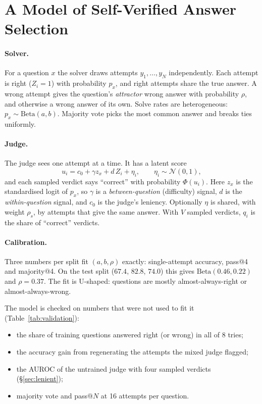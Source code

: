 \section{A Model of Self-Verified Answer Selection}
\label{sec:model}

\paragraph{Solver.}
For a question $x$ the solver draws attempts $y_1,\dots,y_N$ independently. Each attempt is right ($Z_i=1$) with
probability $p_x$, and right attempts share the true answer. A wrong attempt gives the question's \emph{attractor}
wrong answer with probability $\rho$, and otherwise a wrong answer of its own. Solve rates are heterogeneous:
$p_x\sim\mathrm{Beta}(a,b)$. Majority vote picks the most common answer and breaks ties uniformly.

\paragraph{Judge.}
The judge sees one attempt at a time. It has a latent score
\begin{equation}
u_i = c_0 + \gamma z_x + d\,Z_i + \eta_i,\qquad \eta_i\sim\mathcal N(0,1),
\label{eq:judge}
\end{equation}
and each sampled verdict says ``correct'' with probability $\Phi(u_i)$. Here $z_x$ is the standardised logit of
$p_x$, so $\gamma$ is a \emph{between-question} (difficulty) signal, $d$ is the \emph{within-question} signal, and
$c_0$ is the judge's leniency. Optionally $\eta$ is shared, with weight $\rho_s$, by attempts that give the same
answer. With $V$ sampled verdicts, $q_i$ is the share of ``correct'' verdicts.

\paragraph{Calibration.}
Three numbers per split fit $(a,b,\rho)$ exactly: single-attempt accuracy, pass@4 and majority@4. On the test split
($67.4$, $82.8$, $74.0$) this gives $\mathrm{Beta}(0.46, 0.22)$ and $\rho=0.37$. The fit is U-shaped: questions are
mostly almost-always-right or almost-always-wrong.

The model is checked on numbers that were not used to fit it (Table~\ref{tab:validation}):
\begin{itemize}
\item the share of training questions answered right (or wrong) in all of 8 tries;
\item the accuracy gain from regenerating the attempts the mixed judge flagged;
\item the AUROC of the untrained judge with four sampled verdicts (\S\ref{sec:lenient});
\item majority vote and pass@$N$ at 16 attempts per question.
\end{itemize}

